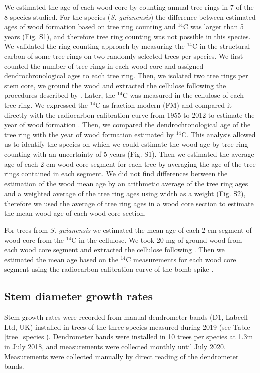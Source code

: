 \documentclass{article}
\begin{document}
We estimated the age of each wood core by counting annual tree rings in 7 of the 8 species studied. For the species (\textit{S. guianensis}) the difference between estimated ages of wood formation based on tree ring counting and $^{14}$C was larger than 5 years (Fig. S1), and therefore tree ring counting was not possible in this species. We validated the ring counting approach by measuring the $^{14}$C in the structural carbon of some tree rings on two randomly selected trees per species. We first counted the number of tree rings in each wood core and assigned dendrochronological ages to each tree ring. Then, we isolated two tree rings per stem core, we ground the wood and extracted the cellulose following the procedures described by \citet{steinhof:2017}. Later, the $^{14}$C was measured in the cellulose of each tree ring. We expressed the $^{14}$C as fraction modern (FM) and compared it directly with the radiocarbon calibration curve from 1955 to 2012 \citep{hua:2013} to estimate the year of wood formation \citep{Andreu-Hayles:2015wb}. Then, we compared the dendrochronological age of the tree ring with the year of wood formation estimated by $^{14}$C. This analysis allowed us to identify the species on which we could estimate the wood age by tree ring counting with an uncertainty of  5 years (Fig. S1). Then we estimated the average age of each 2 cm wood core segment for each tree by averaging the age of the tree rings contained in each segment. We did not find differences between the estimation of the wood mean age by an arithmetic average of the tree ring ages and a weighted average of the tree ring ages using width as a weight (Fig. S2), therefore we used the average of tree ring ages in a wood core section to estimate the mean wood age of each wood core section.

For trees from \textit{S. guianensis} we estimated the mean age of each 2 cm segment of wood core from the $^{14}$C in the cellulose. We took 20 mg of ground wood from each wood core segment and extracted the cellulose following \citet{steinhof:2017}. Then we estimated the mean age based on the $^{14}$C measurements for each wood core segment using the radiocarbon calibration curve of the bomb spike \citep{hua:2013}.


\subsection{Stem diameter growth rates}

Stem growth rates were recorded from manual dendrometer bands (D1, Labcell Ltd, UK) installed in trees of the three species measured during 2019 (see Table \ref{tree_species}). Dendrometer bands were installed in 10 trees per species at 1.3m in July 2018, and measurements were collected monthly until July 2020. Measurements were collected manually by direct reading of the dendrometer bands.
 
\end{document}
